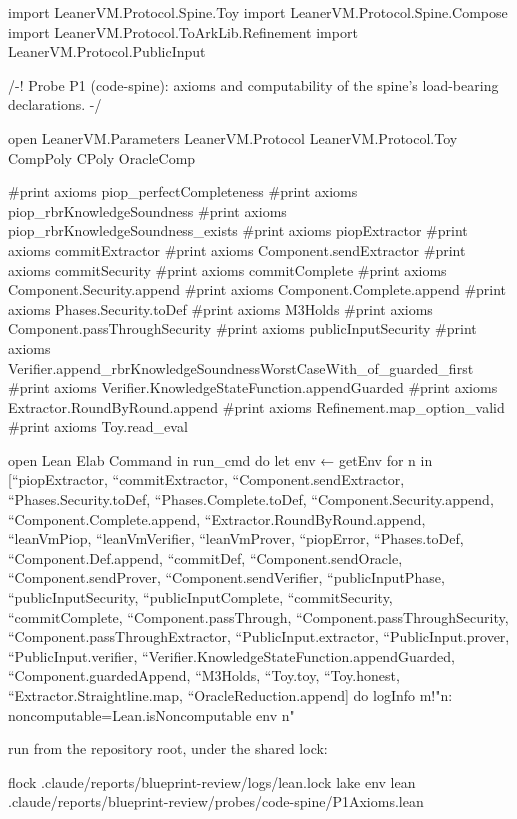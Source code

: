 \begin{leancode}
import LeanerVM.Protocol.Spine.Toy
import LeanerVM.Protocol.Spine.Compose
import LeanerVM.Protocol.ToArkLib.Refinement
import LeanerVM.Protocol.PublicInput

/-!
Probe P1 (code-spine): axioms and computability of the spine's load-bearing declarations.
-/

open LeanerVM.Parameters LeanerVM.Protocol LeanerVM.Protocol.Toy CompPoly CPoly OracleComp

#print axioms piop_perfectCompleteness
#print axioms piop_rbrKnowledgeSoundness
#print axioms piop_rbrKnowledgeSoundness_exists
#print axioms piopExtractor
#print axioms commitExtractor
#print axioms Component.sendExtractor
#print axioms commitSecurity
#print axioms commitComplete
#print axioms Component.Security.append
#print axioms Component.Complete.append
#print axioms Phases.Security.toDef
#print axioms M3Holds
#print axioms Component.passThroughSecurity
#print axioms publicInputSecurity
#print axioms Verifier.append_rbrKnowledgeSoundnessWorstCaseWith_of_guarded_first
#print axioms Verifier.KnowledgeStateFunction.appendGuarded
#print axioms Extractor.RoundByRound.append
#print axioms Refinement.map_option_valid
#print axioms Toy.read_eval

open Lean Elab Command in
run_cmd do
  let env ← getEnv
  for n in [``piopExtractor, ``commitExtractor, ``Component.sendExtractor,
      ``Phases.Security.toDef, ``Phases.Complete.toDef, ``Component.Security.append,
      ``Component.Complete.append, ``Extractor.RoundByRound.append, ``leanVmPiop,
      ``leanVmVerifier, ``leanVmProver, ``piopError, ``Phases.toDef, ``Component.Def.append,
      ``commitDef, ``Component.sendOracle, ``Component.sendProver, ``Component.sendVerifier,
      ``publicInputPhase, ``publicInputSecurity, ``publicInputComplete, ``commitSecurity,
      ``commitComplete, ``Component.passThrough, ``Component.passThroughSecurity,
      ``Component.passThroughExtractor, ``PublicInput.extractor, ``PublicInput.prover,
      ``PublicInput.verifier, ``Verifier.KnowledgeStateFunction.appendGuarded,
      ``Component.guardedAppend, ``M3Holds, ``Toy.toy, ``Toy.honest,
      ``Extractor.Straightline.map, ``OracleReduction.append] do
    logInfo m!"{n}: noncomputable={Lean.isNoncomputable env n}"
\end{leancode}

run from the repository root, under the shared lock:

\begin{shellcode}
flock .claude/reports/blueprint-review/logs/lean.lock lake env lean .claude/reports/blueprint-review/probes/code-spine/P1Axioms.lean
\end{shellcode}

